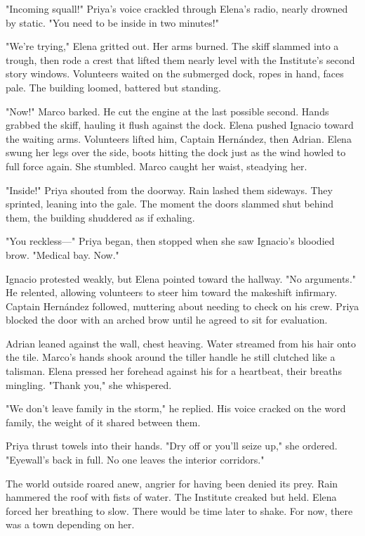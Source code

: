 "Incoming squall!" Priya's voice crackled through Elena's radio, nearly drowned by static. "You need to be inside in two minutes!"

"We're trying," Elena gritted out. Her arms burned. The skiff slammed into a trough, then rode a crest that lifted them nearly level with the Institute's second story windows. Volunteers waited on the submerged dock, ropes in hand, faces pale. The building loomed, battered but standing.

"Now!" Marco barked. He cut the engine at the last possible second. Hands grabbed the skiff, hauling it flush against the dock. Elena pushed Ignacio toward the waiting arms. Volunteers lifted him, Captain Hernández, then Adrian. Elena swung her legs over the side, boots hitting the dock just as the wind howled to full force again. She stumbled. Marco caught her waist, steadying her.

"Inside!" Priya shouted from the doorway. Rain lashed them sideways. They sprinted, leaning into the gale. The moment the doors slammed shut behind them, the building shuddered as if exhaling.

"You reckless—" Priya began, then stopped when she saw Ignacio's bloodied brow. "Medical bay. Now."

Ignacio protested weakly, but Elena pointed toward the hallway. "No arguments." He relented, allowing volunteers to steer him toward the makeshift infirmary. Captain Hernández followed, muttering about needing to check on his crew. Priya blocked the door with an arched brow until he agreed to sit for evaluation.

Adrian leaned against the wall, chest heaving. Water streamed from his hair onto the tile. Marco's hands shook around the tiller handle he still clutched like a talisman. Elena pressed her forehead against his for a heartbeat, their breaths mingling. "Thank you," she whispered.

"We don't leave family in the storm," he replied. His voice cracked on the word family, the weight of it shared between them.

Priya thrust towels into their hands. "Dry off or you'll seize up," she ordered. "Eyewall's back in full. No one leaves the interior corridors."

The world outside roared anew, angrier for having been denied its prey. Rain hammered the roof with fists of water. The Institute creaked but held. Elena forced her breathing to slow. There would be time later to shake. For now, there was a town depending on her.

